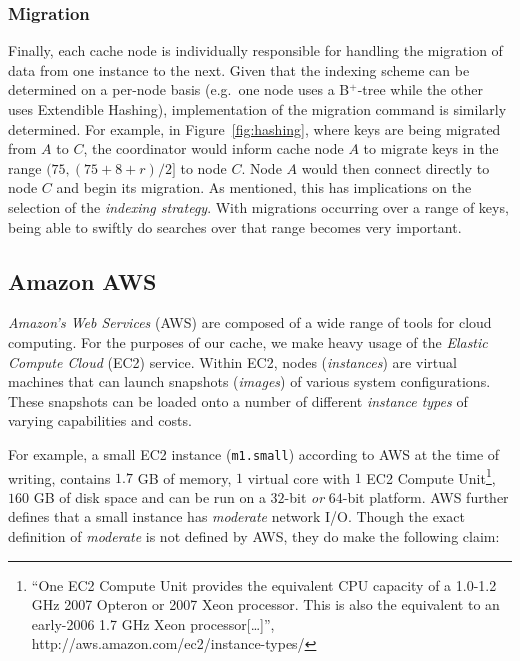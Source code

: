 
\subsubsection{Migration} %
\label{sub:cache_migration}

Finally, each cache node is individually responsible for handling the migration
of data from one instance to the next. Given that the indexing scheme can be
determined on a per-node basis (e.g.\ one node uses a B$^+$-tree while the
other uses Extendible Hashing), implementation of the migration command is
similarly determined. For example, in Figure~\ref{fig:hashing}, where keys are
being migrated from $A$ to $C$, the coordinator would inform cache node $A$ to
migrate keys in the range $(75,(75 + 8 + r)/2]$ to node $C$. Node $A$ would
then connect directly to node $C$ and begin its migration. As mentioned, this
has implications on the selection of the \emph{indexing strategy}. With
migrations occurring over a range of keys, being able to swiftly do searches
over that range becomes very important.



\subsection{Amazon AWS} %
\label{sec:Amazon_AWS}
\emph{Amazon's Web Services} (AWS) are composed of a wide range of tools for
cloud computing. For the purposes of our cache, we make heavy usage of the
\emph{Elastic Compute Cloud} (EC2) service. Within EC2, nodes
(\emph{instances}) are virtual machines that can launch snapshots
(\emph{images}) of various system configurations. These snapshots can be loaded
onto a number of different \emph{instance types} of varying capabilities and
costs.

For example, a small EC2 instance ({\tt m1.small}) according to
AWS\cite{amazonEC2InstanceTypes} at the time of writing, contains $1.7$ GB of
memory, $1$ virtual core with $1$ EC2 Compute Unit\footnote{``One EC2 Compute
  Unit provides the equivalent CPU capacity of a 1.0-1.2 GHz 2007 Opteron or
2007 Xeon processor. This is also the equivalent to an early-2006 1.7 GHz Xeon
processor[\ldots]'', http://aws.amazon.com/ec2/instance-types/}, $160$ GB of
disk space and can be run on a $32$-bit \emph{or} $64$-bit platform. AWS
further defines that a small instance has \emph{moderate} network I/O. Though
the exact definition of \emph{moderate} is not defined by AWS, they do make the
following claim\cite{amazonEC2InstanceTypes}:

